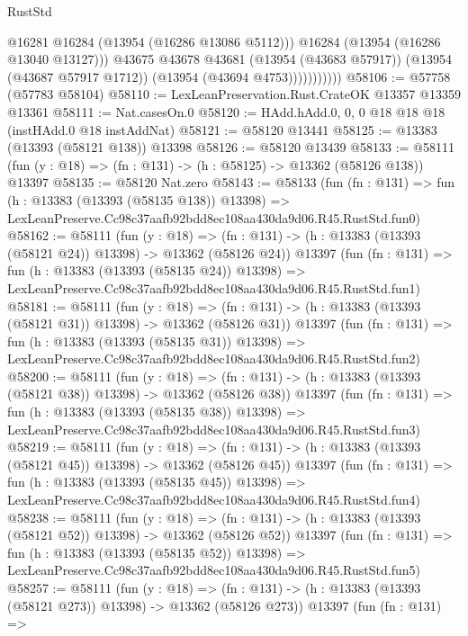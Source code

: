 \begin{lexlean}{RustStd}
\begin{coremodule}
                          @16281
                          @16284
                          (@13954 (@16286 @13086 @5112)))
                        @16284
                        (@13954 (@16286 @13040 @13127)))
                      @43675
                      @43678
                      @43681
                      (@13954 (@43683 @57917))
                      (@13954 (@43687 @57917 @1712))
                      (@13954 (@43694 @4753)))))))))))
@58106 := @57758 (@57783 @58104)
@58110 := LexLeanPreservation.Rust.CrateOK @13357 @13359 @13361
@58111 := Nat.casesOn.{0}
@58120 := HAdd.hAdd.{0, 0, 0} @18 @18 @18 (instHAdd.{0} @18 instAddNat)
@58121 := @58120 @13441
@58125 := @13383 (@13393 (@58121 @138)) @13398
@58126 := @58120 @13439
@58133 := @58111 (fun (y : @18) => (fn : @131) -> (h : @58125) -> @13362 (@58126 @138)) @13397
@58135 := @58120 Nat.zero
@58143 := @58133
    (fun (fn : @131) =>
    fun (h : @13383 (@13393 (@58135 @138)) @13398) =>
    LexLeanPreserve.Cc98c37aafb92bdd8ec108aa430da9d06.R45.RustStd.fun0)
@58162 := @58111
    (fun (y : @18) =>
    (fn : @131) -> (h : @13383 (@13393 (@58121 @24)) @13398) -> @13362 (@58126 @24))
    @13397
    (fun (fn : @131) =>
    fun (h : @13383 (@13393 (@58135 @24)) @13398) =>
    LexLeanPreserve.Cc98c37aafb92bdd8ec108aa430da9d06.R45.RustStd.fun1)
@58181 := @58111
    (fun (y : @18) =>
    (fn : @131) -> (h : @13383 (@13393 (@58121 @31)) @13398) -> @13362 (@58126 @31))
    @13397
    (fun (fn : @131) =>
    fun (h : @13383 (@13393 (@58135 @31)) @13398) =>
    LexLeanPreserve.Cc98c37aafb92bdd8ec108aa430da9d06.R45.RustStd.fun2)
@58200 := @58111
    (fun (y : @18) =>
    (fn : @131) -> (h : @13383 (@13393 (@58121 @38)) @13398) -> @13362 (@58126 @38))
    @13397
    (fun (fn : @131) =>
    fun (h : @13383 (@13393 (@58135 @38)) @13398) =>
    LexLeanPreserve.Cc98c37aafb92bdd8ec108aa430da9d06.R45.RustStd.fun3)
@58219 := @58111
    (fun (y : @18) =>
    (fn : @131) -> (h : @13383 (@13393 (@58121 @45)) @13398) -> @13362 (@58126 @45))
    @13397
    (fun (fn : @131) =>
    fun (h : @13383 (@13393 (@58135 @45)) @13398) =>
    LexLeanPreserve.Cc98c37aafb92bdd8ec108aa430da9d06.R45.RustStd.fun4)
@58238 := @58111
    (fun (y : @18) =>
    (fn : @131) -> (h : @13383 (@13393 (@58121 @52)) @13398) -> @13362 (@58126 @52))
    @13397
    (fun (fn : @131) =>
    fun (h : @13383 (@13393 (@58135 @52)) @13398) =>
    LexLeanPreserve.Cc98c37aafb92bdd8ec108aa430da9d06.R45.RustStd.fun5)
@58257 := @58111
    (fun (y : @18) =>
    (fn : @131) -> (h : @13383 (@13393 (@58121 @273)) @13398) -> @13362 (@58126 @273))
    @13397
    (fun (fn : @131) =>

\end{coremodule}
\end{lexlean}

